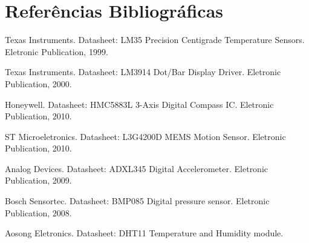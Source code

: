 \section{Referências Bibliográficas}
\indent \par
[1] Texas Instruments. Datasheet: LM35 Precision Centigrade Temperature Sensors. Eletronic Publication, 1999.
\indent \par [2] Texas Instruments. Datasheet: LM3914 Dot/Bar Display Driver. Eletronic Publication, 2000.
\indent \par [3] Honeywell. Datasheet: HMC5883L 3-Axis Digital Compass IC. Eletronic Publication, 2010.
\indent \par [4] ST Microeletronics. Datasheet: L3G4200D MEMS Motion Sensor. Eletronic Publication, 2010.
\indent \par [5] Analog Devices. Datasheet: ADXL345 Digital Accelerometer. Eletronic Publication, 2009.
\indent \par [6] Bosch Sensortec. Datasheet: BMP085 Digital pressure sensor. Eletronic Publication, 2008.
\indent \par [7] Aosong Eletronics. Datasheet: DHT11 Temperature and Humidity module.
